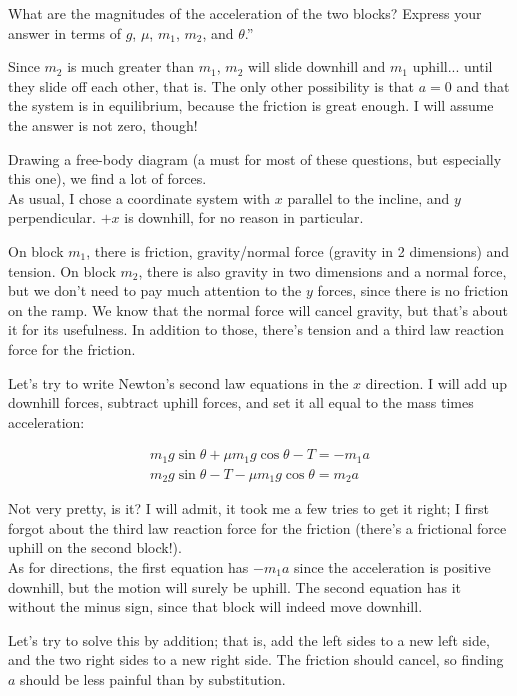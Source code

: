 \documentclass[8.01x]{subfiles}
\begin{document}
What are the magnitudes of the acceleration of the two blocks? Express your answer in terms of $g$, $\mu$, $m_1$, $m_2$, and $\theta$.''

Since $m_2$ is much greater than $m_1$, $m_2$ will slide downhill and $m_1$ uphill... until they slide off each other, that is. The only other possibility is that $a = 0$ and that the system is in equilibrium, because the friction is great enough. I will assume the answer is not zero, though!

Drawing a free-body diagram (a must for most of these questions, but especially this one), we find a lot of forces.\\
As usual, I chose a coordinate system with $x$ parallel to the incline, and $y$ perpendicular. $+x$ is downhill, for no reason in particular.

On block $m_1$, there is friction, gravity/normal force (gravity in 2 dimensions) and tension. On block $m_2$, there is also gravity in two dimensions and a normal force, but we don't need to pay much attention to the $y$ forces, since there is no friction on the ramp. We know that the normal force will cancel gravity, but that's about it for its usefulness. In addition to those, there's tension and a third law reaction force for the friction.

Let's try to write Newton's second law equations in the $x$ direction. I will add up downhill forces, subtract uphill forces, and set it all equal to the mass times acceleration:

\begin{align}
m_1 g \sin \theta + \mu m_1 g \cos \theta - T = - m_1 a\\
m_2 g \sin \theta - T - \mu m_1 g \cos \theta = m_2 a
\end{align}

Not very pretty, is it? I will admit, it took me a few tries to get it right; I first forgot about the third law reaction force for the friction (there's a frictional force uphill on the second block!).\\
As for directions, the first equation has $-m_1 a$ since the acceleration is positive downhill, but the motion will surely be uphill. The second equation has it without the minus sign, since that block will indeed move downhill.

Let's try to solve this by addition; that is, add the left sides to a new left side, and the two right sides to a new right side. The friction should cancel, so finding $a$ should be less painful than by substitution.
\end{document}
